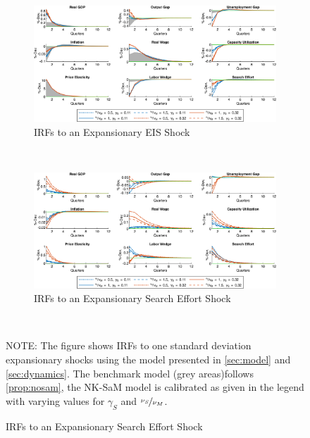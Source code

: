 \documentclass[12pt,3p,authoryear,review]{elsarticle}
\begin{document}
\begin{figure}[h!]%
	\centering%
	\caption{Variation in $\nicefrac{\nu_S}{\nu_M}$ - IRFs to Expansionary Cost Push Shocks}
	\begin{subfigure}{\textwidth}%
		\centering%
        \caption{IRFs to an Expansionary EIS Shock}%
        \includegraphics[width=\textwidth]{fig_16_irf_robust_nuSnuM_eis.png}%
	\end{subfigure}\\%
	\vspace{0.2in}%
	\begin{subfigure}{\textwidth}%
        \centering%
        \caption{IRFs to an Expansionary Search Effort Shock}%
        \includegraphics[width=\textwidth]{fig_17_irf_robust_nuSnuM_search.png}%
    \end{subfigure}\\%
    {\tiny \singlespacing NOTE: The figure shows IRFs to one standard deviation expansionary shocks using the model presented in \cref{sec:model} and \cref{sec:dynamics}. The benchmark model (grey areas)follows \cref{prop:nosam}, the NK-SaM model is calibrated as given in the legend with varying values for $\gamma_S$ and $\nicefrac{\nu_S}{\nu_M}$.\par}%
\end{figure}%
\end{document}

